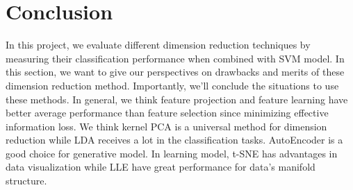 \documentclass{article}
\begin{document}
\section{Conclusion}
In this project, we evaluate different dimension reduction techniques by measuring their classification performance when combined with SVM model. In this section, we want to give our perspectives on drawbacks and merits of these dimension reduction method. Importantly, we'll conclude the situations to use these methods. In general, we think feature projection and feature learning have better average performance than feature selection since minimizing effective information loss. We think kernel PCA is a universal method for dimension reduction while LDA receives a lot in the classification tasks. AutoEncoder is a good choice for generative model. In learning model, t-SNE has advantages in data visualization while LLE have great performance for data’s manifold structure.


\end{document}
